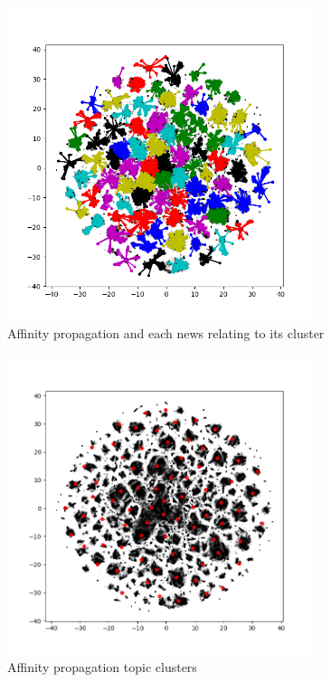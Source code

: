 \documentclass[ecp,tc,english]{iiufrgs}
\begin{document}
            \begin{figure}
                \centering
                \includegraphics[width=0.8\textwidth]{images/affinity_plot.png}
                \caption{Affinity propagation and each news relating to its cluster}
                \label{fig:my_label}
            \end{figure}
            
            \begin{figure}
                \centering
                \includegraphics[width=0.8\textwidth]{images/tsne_clusters_plot.png}
                \caption{Affinity propagation topic clusters}
                \label{fig:my_label}
            \end{figure}    
    
\end{document}
